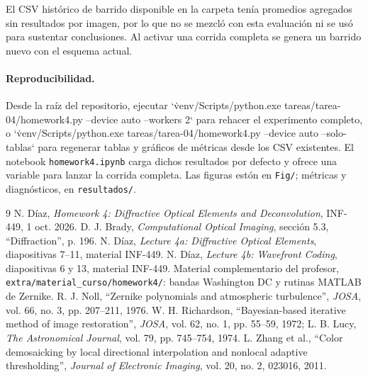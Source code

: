 \documentclass[11pt,a4paper]{article}
\begin{document}
El CSV hist\'orico de barrido disponible en la carpeta ten\'ia promedios agregados sin resultados por imagen, por lo que no se mezcl\'o con esta evaluaci\'on ni se us\'o para sustentar conclusiones. Al activar una corrida completa se genera un barrido nuevo con el esquema actual.

\paragraph{Reproducibilidad.} Desde la ra\'iz del repositorio, ejecutar `\.venv/Scripts/python.exe tareas/tarea-04/homework4.py --device auto --workers 2` para rehacer el experimento completo, o `\.venv/Scripts/python.exe tareas/tarea-04/homework4.py --device auto --solo-tablas` para regenerar tablas y gr\'aficos de m\'etricas desde los CSV existentes. El notebook \texttt{homework4.ipynb} carga dichos resultados por defecto y ofrece una variable para lanzar la corrida completa. Las figuras est\'on en \texttt{Fig/}; m\'etricas y diagn\'osticos, en \texttt{resultados/}.

\begin{thebibliography}{9}
 N. D\'iaz, \emph{Homework 4: Diffractive Optical Elements and Deconvolution}, INF-449, 1 oct. 2026.
 D. J. Brady, \emph{Computational Optical Imaging}, secci\'on 5.3, ``Diffraction'', p. 196.
 N. D\'iaz, \emph{Lecture 4a: Diffractive Optical Elements}, diapositivas 7--11, material INF-449.
 N. D\'iaz, \emph{Lecture 4b: Wavefront Coding}, diapositivas 6 y 13, material INF-449.
 Material complementario del profesor, \texttt{extra/material\_curso/homework4/}: bandas Washington DC y rutinas MATLAB de Zernike.
 R. J. Noll, ``Zernike polynomials and atmospheric turbulence'', \emph{JOSA}, vol. 66, no. 3, pp. 207--211, 1976.
 W. H. Richardson, ``Bayesian-based iterative method of image restoration'', \emph{JOSA}, vol. 62, no. 1, pp. 55--59, 1972; L. B. Lucy, \emph{The Astronomical Journal}, vol. 79, pp. 745--754, 1974.
 L. Zhang et al., ``Color demosaicking by local directional interpolation and nonlocal adaptive thresholding'', \emph{Journal of Electronic Imaging}, vol. 20, no. 2, 023016, 2011.
\end{thebibliography}
\end{document}
